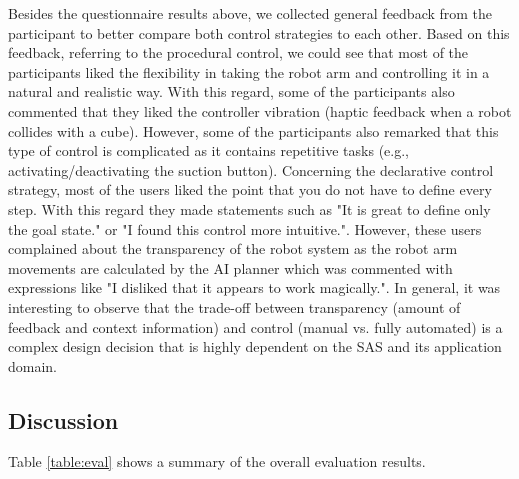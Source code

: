 \documentclass[10pt, conference]{IEEEtran}
\begin{document}
Besides the questionnaire results above, we collected general feedback from the participant to better compare both control strategies to each other. Based on this feedback, referring to the procedural control, we could see that most of the participants liked the flexibility in taking the robot arm and controlling it in a natural and realistic way. With this regard, some of the participants also commented that they liked the controller vibration (haptic feedback when a robot collides with a cube). However, some of the participants also remarked that this type of control is complicated as it contains repetitive tasks (e.g., activating/deactivating the suction button).   
Concerning the declarative control strategy, most of the users liked the point that you do not have to define every step. With this regard they made statements such as "It is great to define only the goal state." or "I found this control more intuitive.". However, these users complained about the transparency of the robot system as the robot arm movements are calculated by the AI planner which was commented with expressions like "I disliked that it appears to work magically.". In general, it was interesting to observe that the trade-off between transparency (amount of feedback and context information) and control (manual vs. fully automated) is a complex design decision that is highly dependent on the SAS and its application domain. 

\subsection{Discussion}
\label{evalDiscussion}

Table \ref{table:eval} shows a summary of the overall evaluation results. 
\end{document}

